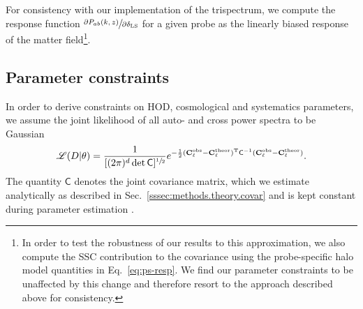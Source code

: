 \documentclass[a4paper,11pt]{article}
\begin{document}
For consistency with our implementation of the trispectrum, we compute the response function $\sfrac{\partial P_{ab}(k, z)}{\partial \delta_{\rm LS}} $ for a given probe as the linearly biased response of the matter field\footnote{In order to test the robustness of our results to this approximation, we also compute the SSC contribution to the covariance using the probe-specific halo model quantities in Eq.~\ref{eq:ps-resp}. We find our parameter constraints to be unaffected by this change and therefore resort to the approach described above for consistency.}. 

  \subsection{Parameter constraints}\label{ssec:methods.constr}
    In order to derive constraints on HOD, cosmological and systematics parameters, we assume the joint likelihood of all auto- and cross power spectra to be Gaussian 
    \begin{align}
      \mathscr{L}(D \vert \theta) = \frac{1}{[(2\pi)^{d}\det{\mathsf{C}}]^{\sfrac{1}{2}}} e^{-\frac{1}{2}(\mathbf{C}^{\mathrm{obs}}_{\ell}-\mathbf{C}^{\mathrm{theor}}_{\ell})^{\mathrm{T}}\mathsf{C}^{-1}(\mathbf{C}^{\mathrm{obs}}_{\ell}-\mathbf{C}^{\mathrm{theor}}_{\ell})}.
      \label{eq:likelihood}
    \end{align}
    The quantity $\mathsf{C}$ denotes the joint covariance matrix, which we estimate analytically as described in Sec.~\ref{sssec:methods.theory.covar} and is kept constant during parameter estimation \citep{2019OJAp....2E...3K}.
\end{document}

